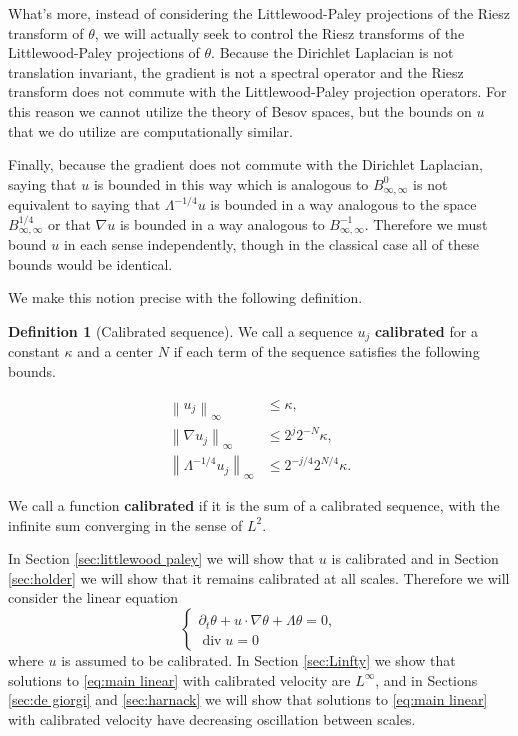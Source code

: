 \documentclass[11pt]{amsart}
\theoremstyle{remark}
\theoremstyle{definition}
\newtheorem{definition}{Definition}
\newcommand{\norm}[1]{\left\lVert#1\right\rVert}
\newcommand{\del}{\partial}
\newcommand{\grad}{\nabla}
\renewcommand{\div}{\operatorname{div}}
\begin{document}
What's more, instead of considering the Littlewood-Paley projections of the Riesz transform of $\theta$, we will actually seek to control the Riesz transforms of the Littlewood-Paley projections of $\theta$.  Because the Dirichlet Laplacian is not translation invariant, the gradient is not a spectral operator and the Riesz transform does not commute with the Littlewood-Paley projection operators.  For this reason we cannot utilize the theory of Besov spaces, but the bounds on $u$ that we do utilize are computationally similar.  

Finally, because the gradient does not commute with the Dirichlet Laplacian, saying that $u$ is bounded in this way which is analogous to $B^0_{\infty,\infty}$ is not equivalent to saying that $\Lambda^{-1/4} u$ is bounded in a way analogous to the space $B^{1/4}_{\infty,\infty}$ or that $\grad u$ is bounded in a way analogous to $B^{-1}_{\infty,\infty}$.  Therefore we must bound $u$ in each sense independently, though in the classical case all of these bounds would be identical.  

We make this notion precise with the following definition.  

\begin{definition}[Calibrated sequence] \label{def:calibrated}
We call a sequence $u_j$ \textbf{calibrated} for a constant $\kappa$ and a center $N$ if each term of the sequence satisfies the following bounds.  

\begin{align*}
\norm{u_j}_\infty &\leq \kappa, \\
\norm{\grad u_j}_\infty &\leq 2^{j} 2^{-N} \kappa, \\
\norm{\Lambda^{-1/4} u_j}_\infty &\leq 2^{-j/4} 2^{N/4} \kappa.  
\end{align*} 

We call a function \textbf{calibrated} if it is the sum of a calibrated sequence, with the infinite sum converging in the sense of $L^2$.  

\end{definition}

In Section \ref{sec:littlewood paley} we will show that $u$ is calibrated and in Section \ref{sec:holder} we will show that it remains calibrated at all scales.  Therefore we will consider the linear equation
\begin{equation} \label{eq:main linear} \begin{cases}
\del_t \theta + u \cdot \grad \theta + \Lambda \theta = 0, \\
\div u = 0
\end{cases} \end{equation}
where $u$ is assumed to be calibrated.  In Section \ref{sec:Linfty} we show that solutions to \eqref{eq:main linear} with calibrated velocity are $L^\infty$, and in Sections \ref{sec:de giorgi} and \ref{sec:harnack} we will show that solutions to \eqref{eq:main linear} with calibrated velocity have decreasing oscillation between scales.  
\end{document}
